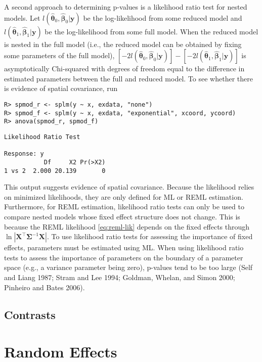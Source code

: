 \documentclass{article}
\begin{document}
A second approach to determining p-values is a likelihood ratio test for
nested models. Let
\(l(\bm{\hat{\theta}}_0, \bm{\hat{\beta}}_0 | \mathbf{y} )\) be the
log-likelihood from some reduced model and
\(l(\bm{\hat{\theta}}_1, \bm{\hat{\beta}}_1 | \mathbf{y} )\) be the
log-likelihood from some full model. When the reduced model is nested in
the full model (i.e., the reduced model can be obtained by fixing some
parameters of the full model),
\([-2l(\bm{\hat{\theta}}_0, \bm{\hat{\beta}}_0 | \mathbf{y} )] - [-2l(\bm{\hat{\theta}}_1, \bm{\hat{\beta}}_1 | \mathbf{y} )]\)
is asymptotically Chi-squared with degrees of freedom equal to the
difference in estimated parameters between the full and reduced model.
To see whether there is evidence of spatial covariance, run

\begin{verbatim}
R> spmod_r <- splm(y ~ x, exdata, "none")
R> spmod_f <- splm(y ~ x, exdata, "exponential", xcoord, ycoord)
R> anova(spmod_r, spmod_f)
\end{verbatim}

\begin{verbatim}
Likelihood Ratio Test

Response: y
           Df     X2 Pr(>X2)
1 vs 2  2.000 20.139       0
\end{verbatim}

This output suggests evidence of spatial covariance. Because the
likelihood relies on minimized likelihoods, they are only defined for ML
or REML estimation. Furthermore, for REML estimation, likelihood ratio
tests can only be used to compare nested models whose fixed effect
structure does not change. This is because the REML likelihood
\eqref{eq:reml-lik} depends on the fixed effects through
\(\ln{|\mathbf{X}^\intercal \mathbf{\Sigma}^{-1} \mathbf{X}|}\). To use
likelihood ratio tests for assessing the importance of fixed effects,
parameters must be estimated using ML. When using likelihood ratio tests
to assess the importance of parameters on the boundary of a parameter
space (e.g., a variance parameter being zero), p-values tend to be too
large (Self and Liang 1987; Stram and Lee 1994; Goldman, Whelan, and
Simon 2000; Pinheiro and Bates 2006).

\hypertarget{contrasts}{%
\subsection{Contrasts}\label{contrasts}}

\hypertarget{random-effects}{%
\section{Random Effects}\label{random-effects}}
\end{document}
